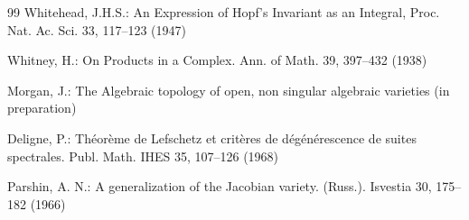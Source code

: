 \documentclass[11pt]{amsart}
\theoremstyle{plain}
\theoremstyle{definition}
\begin{document}
\begin{thebibliography}{99}
 Whitehead, J.H.S.: An Expression of Hopf's Invariant as an Integral, Proc. Nat. Ac. Sci. 33, 117--123 (1947)

 Whitney, H.: On Products in a Complex. Ann. of Math. 39, 397--432 (1938)

 Morgan, J.: The Algebraic topology of open, non singular algebraic varieties (in preparation)

 Deligne, P.: Th\'{e}or\`{e}me de Lefschetz et crit\`{e}res de d\'{e}g\'{e}n\'{e}rescence de suites spectrales. Publ. Math. IHES 35, 107--126 (1968)

 Parshin, A. N.: A generalization of the Jacobian variety. (Russ.). Isvestia 30, 175--182 (1966)

\end{thebibliography}
\end{document}
